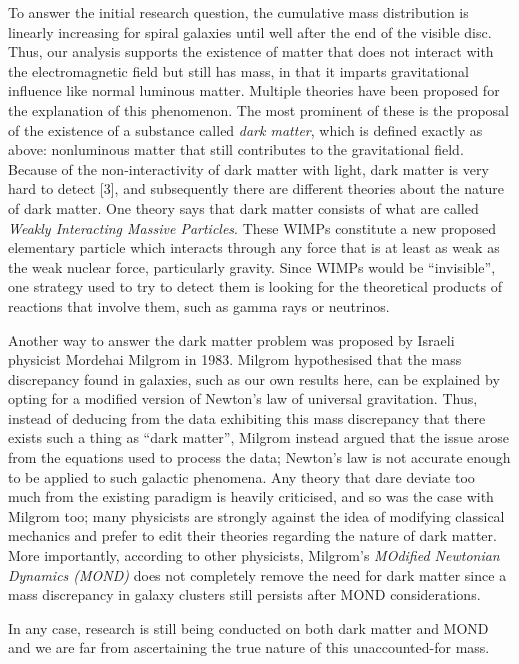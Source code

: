 \documentclass{article}
\begin{document}
To answer the initial research question, the cumulative mass distribution is linearly increasing for spiral galaxies until well after the end of the visible disc.
Thus, our analysis supports the existence of matter that does not interact with the electromagnetic field but still has mass, in that it imparts gravitational influence like normal luminous matter.
Multiple theories have been proposed for the explanation of this phenomenon.
The most prominent of these is the proposal of the existence of a substance called \textit{dark matter}, which is defined exactly as above: nonluminous matter that still contributes to the gravitational field.
Because of the non-interactivity of dark matter with light, dark matter is very hard to detect [3], and subsequently there are different theories about the nature of dark matter.
One theory says that dark matter consists of what are called \textit{Weakly Interacting Massive Particles}.
These WIMPs constitute a new proposed elementary particle which interacts through any force that is at least as weak as the weak nuclear force, particularly gravity.
Since WIMPs would be ``invisible'', one strategy used to try to detect them is looking for the theoretical products of reactions that involve them, such as gamma rays or neutrinos.

Another way to answer the dark matter problem was proposed by Israeli physicist Mordehai Milgrom in 1983.
Milgrom hypothesised that the mass discrepancy found in galaxies, such as our own results here, can be explained by opting for a modified version of Newton's law of universal gravitation.
Thus, instead of deducing from the data exhibiting this mass discrepancy that there exists such a thing as ``dark matter'', Milgrom instead argued that the issue arose from the equations used to process the data; Newton's law is not accurate enough to be applied to such galactic phenomena.
Any theory that dare deviate too much from the existing paradigm is heavily criticised, and so was the case with Milgrom too; many physicists are strongly against the idea of modifying classical mechanics and prefer to edit their theories regarding the nature of dark matter.
More importantly, according to other physicists, Milgrom's \textit{MOdified Newtonian Dynamics (MOND)} does not completely remove the need for dark matter since a mass discrepancy in galaxy clusters still persists after MOND considerations.

In any case, research is still being conducted on both dark matter and MOND and we are far from ascertaining the true nature of this unaccounted-for mass.
\end{document}
